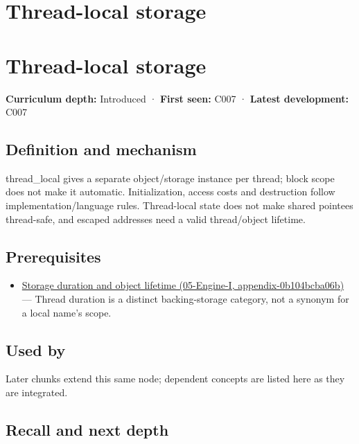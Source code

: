 \hypertarget{appendix-3b88c6cd7195}{}
\section*{Thread-local storage}
\section{Thread-local storage}\label{appendix-3b88c6cd7195-thread-local-storage}

\textbf{Curriculum depth:} Introduced · \textbf{First seen:} C007 · \textbf{Latest development:} C007

\subsection{Definition and mechanism}\label{appendix-3b88c6cd7195-definition-and-mechanism}

thread\_local gives a separate object/storage instance per thread; block scope does not make it automatic. Initialization, access costs and destruction follow implementation/language rules. Thread-local state does not make shared pointees thread-safe, and escaped addresses need a valid thread/object lifetime.

\subsection{Prerequisites}\label{appendix-3b88c6cd7195-prerequisites}

\begin{itemize}
\tightlist
\item
  \href{../05-Engine-I/main.pdf\#nameddest=appendix-0b104bcba06b}{Storage duration and object lifetime (05-Engine-I, appendix-0b104bcba06b)} --- Thread duration is a distinct backing-storage category, not a synonym for a local name's scope.
\end{itemize}

\subsection{Used by}\label{appendix-3b88c6cd7195-used-by}

Later chunks extend this same node; dependent concepts are listed here as they are integrated.

\subsection{Recall and next depth}\label{appendix-3b88c6cd7195-recall-and-next-depth}

